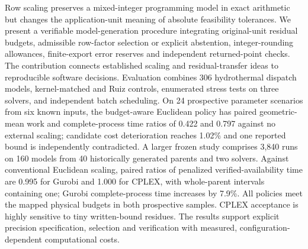 Row scaling preserves a mixed-integer programming model in exact arithmetic but
changes the application-unit meaning of absolute feasibility tolerances. We
present a verifiable model-generation procedure integrating original-unit
residual budgets, admissible row-factor selection or explicit abstention,
integer-rounding allowances, finite-export error reserves and independent
returned-point checks. The contribution connects established scaling and
residual-transfer ideas to reproducible software decisions. Evaluation combines
306 hydrothermal dispatch models, kernel-matched and Ruiz controls, enumerated
stress tests on three solvers, and independent batch scheduling. On 24 prospective
parameter scenarios from six known inputs, the budget-aware Euclidean policy
has paired geometric-mean work and complete-process time ratios of 0.422 and
0.797 against no external scaling; candidate cost deterioration reaches 1.02\%
and one reported bound is independently contradicted. A larger frozen study
comprises 3,840 runs on 160 models from 40 historically generated parents and
two solvers. Against conventional Euclidean scaling, paired ratios of penalized
verified-availability time are 0.995 for Gurobi and 1.000 for CPLEX, with
whole-parent intervals containing one; Gurobi complete-process time increases
by 7.9\%. All policies meet the mapped physical budgets in both prospective
samples. CPLEX acceptance is highly sensitive to tiny written-bound residues.
The results support explicit precision specification, selection and verification
with measured, configuration-dependent computational costs.
